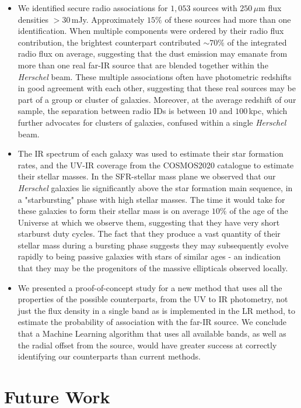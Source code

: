 \begin{itemize}
    \item We identified secure radio associations for $1,053$ sources with $250\,\mu$m flux densities $>30\,$mJy. Approximately $15\%$ of these sources had more than one identification. When multiple components were ordered by their radio flux contribution, the brightest counterpart contributed $\sim70\%$ of the integrated radio flux on average, suggesting that the dust emission may emanate from more than one real far-IR source that are blended together within the \textit{Herschel} beam. These multiple associations often have photometric redshifts in good agreement with each other, suggesting that these real sources may be part of a group or cluster of galaxies. Moreover, at the average redshift of our sample, the separation between radio IDs is between $10$ and $100\,$kpc, which further advocates for clusters of galaxies, confused within a single \textit{Herschel} beam.
    \item The IR spectrum of each galaxy was used to estimate their star formation rates, and the UV-IR coverage from the COSMOS2020 catalogue to estimate their stellar masses. In the SFR-stellar mass plane we observed that our \textit{Herschel} galaxies lie significantly above the star formation main sequence, in a "starbursting" phase with high stellar masses. The time it would take for these galaxies to form their stellar mass is on average $10\%$ of the age of the Universe at which we observe them, suggesting that they have very short starburst duty cycles. The fact that they produce a vast quantity of their stellar mass during a bursting phase suggests they may subsequently evolve rapidly to being passive galaxies with stars of similar ages - an indication that they may be the progenitors of the massive ellipticals observed locally.
    \item We presented a proof-of-concept study for a new method that uses all the properties of the possible counterparts, from the UV to IR photometry, not just the flux density in a single band as is implemented in the LR method, to estimate the probability of association with the far-IR source. We conclude that a Machine Learning algorithm that uses all available bands, as well as the radial offset from the source, would have greater success at correctly identifying our counterparts than current methods.
\end{itemize}

\section{Future Work}

